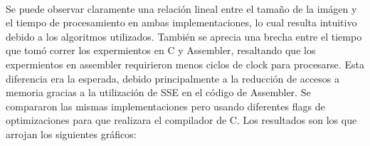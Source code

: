 \documentclass[a4paper]{article}
\begin{document}

\noindent%
\begin{minipage}{\linewidth}%
\end{minipage}
\ \

Se puede observar claramente una relación lineal entre el tamaño de la imágen y el tiempo de procesamiento en ambas implementaciones, lo cual resulta intuitivo debido a los algoritmos utilizados. También se aprecia una brecha entre el tiempo que tomó correr los expermientos en C y Assembler, resaltando que los expermientos en assembler requirieron menos ciclos de clock para procesarse. Esta diferencia era la esperada, debido principalmente a la reducción de accesos a memoria gracias a la utilización de SSE en el código de Assembler. Se compararon las mismas implementaciones pero usando diferentes flags de optimizaciones para que realizara el compilador de C. Los resultados son los que arrojan los siguientes gráficos:

\end{document}
